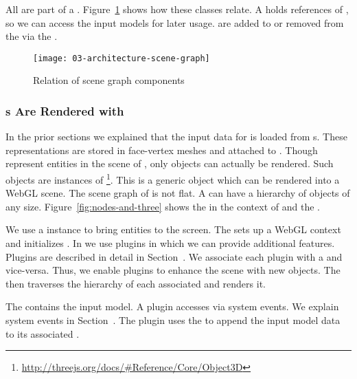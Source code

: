 \documentclass[../../ClassicThesis.tex]{subfiles}
\begin{document}
All  are part of a .
Figure~\ref{fig:scene-graph} shows how these classes relate.
A  holds references of , so we can
access the input models for later usage.  are
added to or removed from the  via the
.

\begin{figure}[h]
  \centering
  \texttt{[image: 03-architecture-scene-graph]}
  \caption{Relation of scene graph components}
  \label{fig:scene-graph}
\end{figure}

\subsubsection{{\threedobject}s Are Rendered with
  {\threejs}}

In the prior sections we explained that the input data for
{\convertify} is loaded from {\stlfile}s. These
{\threedmodel} representations are stored in face-vertex
meshes and attached to .
Though  represent entities in the scene of
{\convertify}, only {\threejs} objects can actually be
rendered. Such {\threejs} objects are instances of
\footnote{\url{http://threejs.org/docs/\#Reference/Core/Object3D}}.
This is a generic object which can be rendered into a WebGL
scene.
The scene graph of {\threejs} is not flat. A
 can have a hierarchy of objects of
any size. Figure~\ref{fig:nodes-and-three} shows the
 in the context of  and
the .

We use a  instance to bring {\threejs}
entities to the screen. The  sets up a WebGL
context and initializes {\threejs}. In {\convertify} we use
plugins in which we can provide additional features. Plugins
are described in detail in
Section~. We associate each
plugin with a  and vice-versa. Thus,
we enable plugins to enhance the scene with new objects. The
 then traverses the hierarchy of each
associated  and renders it.

The  contains the input model. A plugin accesses
 via system events. We explain system events in
Section~. The plugin uses the
 to append the input model data to its
associated .
\end{document}
